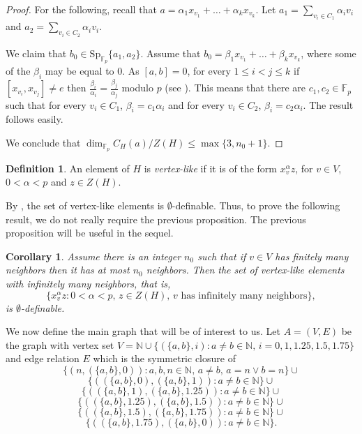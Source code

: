 \documentclass[11pt]{amsart}
\theoremstyle{plain}
\newtheorem{corollary}[theorem]{Corollary}
\theoremstyle{definition}
\newtheorem{definition}[theorem]{Definition}
\theoremstyle{remark}
\numberwithin{equation}{section}
\begin{document}
\begin{proof}
        For the following, recall that $a=\alpha_1x_{v_1}+\dots+ \alpha_k x_{v_k}$. Let $a_1=\sum_{v_i\in C_1}\alpha_iv_i$ and $a_2=\sum_{v_i\in C_2}\alpha_iv_i$.

        We claim that $b_0\in \mathrm{Sp}_{\mathbb{F}_p}\{a_1,a_2\}$. Assume that $b_0=\beta_1x_{v_1}+\dots+\beta_kx_{v_k}$, where some of the $\beta_i$ may be equal to $0$. As $[a,b]=0$, for every $1\leq i<j\leq k$ if $[x_{v_i},x_{v_j}]\neq e$ then $\frac{\beta_i}{\alpha_i}=\frac{\beta_j}{\alpha_j}$ modulo $p$ (see \cite[Lemma A.3.4]{Hodges}). This means that there are $c_1,c_2\in \mathbb{F}_p$ such that for every $v_i\in C_1$, $\beta_i=c_1\alpha_i$ and for every $v_i\in C_2$, $\beta_i=c_2\alpha_i$. The result follows easily.

        We conclude that $\dim_{\mathbb{F}_p}C_H(a)/Z(H)\leq \max\{3,n_0+1\}$.
\end{proof}


\begin{definition}
    An element of $H$ is \emph{vertex-like} if it is of the form $x_v^\alpha z$, for $v\in V$, $0<\alpha<p$ and $z\in Z(H)$.
\end{definition}

    By \cite[Theorem A.3.10(b)]{Hodges}, the set of vertex-like elements is $\emptyset$-definable. Thus, to prove the following result, we do not really require the previous proposition. The previous proposition will be useful in the sequel.
\begin{corollary}
    Assume there is an integer $n_0$ such that if $v\in V$ has finitely many neighbors then it has at most $n_0$ neighbors. Then the set of vertex-like elements with infinitely many neighbors, that is, \[\{x_v^{\alpha}z: 0<\alpha<p,\, z\in Z(H),\, \text{$v$ has infinitely many neighbors}\},\] is $\emptyset$-definable.
\end{corollary}


We now define the main graph that will be of interest to us. 
Let $A=(V,E)$ be the graph with vertex set $V=\mathbb{N}\cup\{(\{a,b\},i): a\neq b\in \mathbb{N},\, i=0,1,1.25,1.5,1.75\}$ and edge relation $E$ which is the symmetric closure of \[\{(n,(\{a,b\},0)): a,b,n\in \mathbb{N},\,a\neq b,\, a=n\vee b=n\}\cup \]\[\{((\{a,b\},0),(\{a,b\},1)): a\neq b\in \mathbb{N}\}\cup\]
\[\{((\{a,b\},1),(\{a,b\},1.25)): a\neq b\in \mathbb{N}\}\cup\]
\[\{((\{a,b\},1.25),(\{a,b\},1.5)): a\neq b\in \mathbb{N}\}\cup\]
\[\{((\{a,b\},1.5),(\{a,b\},1.75)): a\neq b\in \mathbb{N}\}\cup\]
\[\{((\{a,b\},1.75),(\{a,b\},0)): a\neq b\in \mathbb{N}\}.\]
\end{document}
